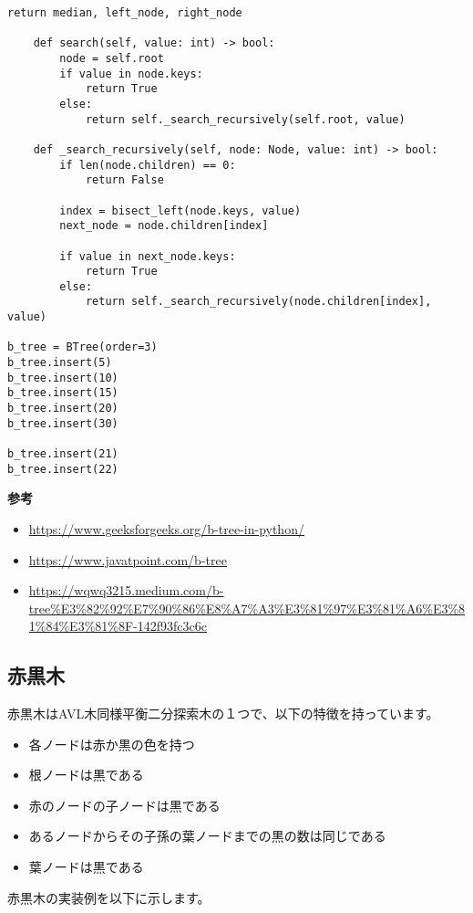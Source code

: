 \begin{lstlisting}[caption=B木の実装, label=btree, frame=TRBL, label={btree}]
        return median, left_node, right_node

    def search(self, value: int) -> bool:
        node = self.root
        if value in node.keys:
            return True
        else:
            return self._search_recursively(self.root, value)
    
    def _search_recursively(self, node: Node, value: int) -> bool:
        if len(node.children) == 0:
            return False
        
        index = bisect_left(node.keys, value)
        next_node = node.children[index]
        
        if value in next_node.keys:
            return True
        else:
            return self._search_recursively(node.children[index], value)

b_tree = BTree(order=3)
b_tree.insert(5)
b_tree.insert(10)
b_tree.insert(15)
b_tree.insert(20)
b_tree.insert(30)

b_tree.insert(21)
b_tree.insert(22)
\end{lstlisting}

\textbf{参考}

\begin{itemize}
  \item \url{https://www.geeksforgeeks.org/b-tree-in-python/}
  \item \url{https://www.javatpoint.com/b-tree}
  \item \url{https://wqwq3215.medium.com/b-tree%E3%82%92%E7%90%86%E8%A7%A3%E3%81%97%E3%81%A6%E3%81%84%E3%81%8F-142f93fc3c6c}
\end{itemize}

\newpage

\subsection{赤黒木}
赤黒木はAVL木同様平衡二分探索木の１つで、以下の特徴を持っています。

\begin{itemize}
  \item 各ノードは赤か黒の色を持つ
  \item 根ノードは黒である
  \item 赤のノードの子ノードは黒である
  \item あるノードからその子孫の葉ノードまでの黒の数は同じである
  \item 葉ノードは黒である
\end{itemize}

赤黒木の実装例を以下に示します。

